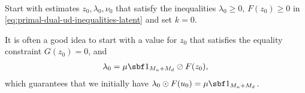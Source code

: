\documentclass[11pt]{article}
\begin{document}
\begin{algorithm}~\label{al:primal-dual-latent}
\begin{steps}
\item Start with estimates $z_0,\lambda_0,\nu_0$ that satisfy the inequalities
  $\lambda_0\ge 0$, $F(z_0)\ge 0$ in \eqref{eq:primal-dual-ud-inequalities-latent} and set $k=0$.

  It is often a good idea to start with a value for $z_0$ that
  satisfies the equality constraint $G(z_0)=0$, and
  \begin{align*}
    \lambda_0=\mu\sbf 1_{M_u+M_d}\oslash F(z_0),
  \end{align*}
  which guarantees that we initially have
  $\lambda_0\odot F(u_0)=\mu\sbf 1_{M_u+M_d}$.



\end{steps}
\end{algorithm}
\end{document}

